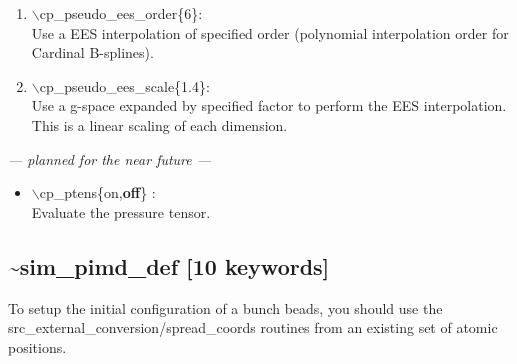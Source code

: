 \documentclass[12pt,titlepage]{article}
\begin{document}
\begin{enumerate}
 \vspace{0.15in} 
 \item  $\backslash$cp\_pseudo\_ees\_order\{6\}: \\     
     Use a EES interpolation of specified order (polynomial interpolation order for Cardinal B-splines).

 \vspace{0.15in} 
 \item  $\backslash$cp\_pseudo\_ees\_scale\{1.4\}: \\     
     Use a g-space expanded by specified factor to perform the EES interpolation.  This is a linear scaling of each dimension.
\end{enumerate}

 \vspace{0.15in} 
{\it
--- planned for the near future ---
\vspace{0.15in} 
\begin{itemize}
 \item  $\backslash$cp\_ptens\{on,{\bf off}\} : \\
      Evaluate the pressure tensor. 
      \end{itemize}
}

\newpage
\subsection*{\bf \~{}sim\_pimd\_def [10 keywords]}

To setup the initial configuration of a bunch beads, you should use the\\
 src\_external\_conversion/spread\_coords routines from an existing set of atomic positions.
\end{document}
